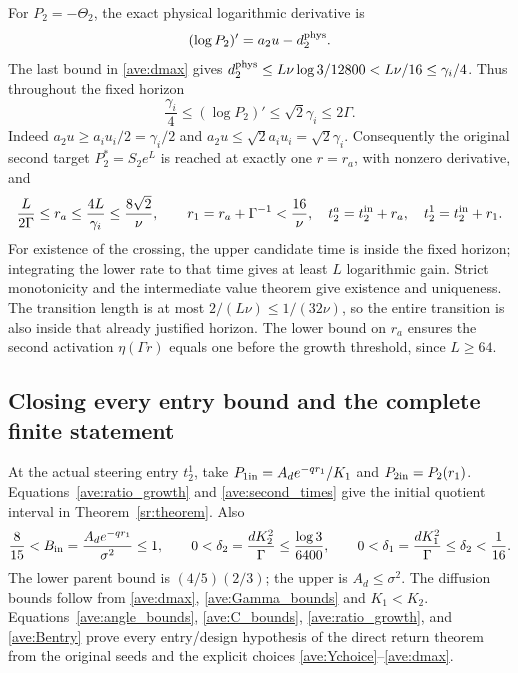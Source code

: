 For $P_2=-\Theta_2$, the exact physical logarithmic derivative is
\[
 (\log P_2)'=a_2u-d_2^{\rm phys}.
\]
The last bound in \eqref{ave:dmax} gives
$d_2^{\rm phys}\leq L\nu\log3/12800<L\nu/16
\leq\gamma_i/4$. Thus throughout the fixed horizon
\begin{equation}\label{ave:growth_rate}
 \frac{\gamma_i}{4}\leq(\log P_2)'
      \leq\sqrt2\gamma_i\leq2\Gamma.
\end{equation}
Indeed $a_2u\geq a_iu_i/2=\gamma_i/2$ and
$a_2u\leq\sqrt2a_iu_i=\sqrt2\gamma_i$.
Consequently the original second target $P_2^*=S_2e^L$ is reached
at exactly one $r=r_a$, with nonzero derivative, and
\begin{equation}\label{ave:second_times}
 \frac{L}{2\Gamma}\leq r_a\leq\frac{4L}{\gamma_i}
       \leq\frac{8\sqrt2}{\nu},\qquad
 r_1=r_a+\Gamma^{-1}<\frac{16}{\nu},
 \quad t_2^a=t_2^{\rm in}+r_a,
 \quad t_2^1=t_2^{\rm in}+r_1.
\end{equation}
For existence of the crossing, the upper candidate time is inside
the fixed horizon; integrating the lower rate to that time gives
at least $L$ logarithmic gain. Strict monotonicity and the intermediate
value theorem give existence and uniqueness. The transition length
is at most $2/(L\nu)\leq1/(32\nu)$, so the entire transition is
also inside that already justified horizon. The lower bound on $r_a$
ensures the second activation $\eta(\Gamma r)$ equals one before
the growth threshold, since $L\geq64$.

\subsection{Closing every entry bound and the complete finite statement}

At the actual steering entry $t_2^1$, take
$P_{1\rm in}=A_de^{-qr_1}/K_1$ and
$P_{2\rm in}=P_2(r_1)$. Equations~\eqref{ave:ratio_growth} and
\eqref{ave:second_times} give the initial quotient interval in
Theorem~\ref{sr:theorem}. Also
\begin{equation}\label{ave:Bentry}
 \frac{8}{15}<B_{\rm in}
 =\frac{A_de^{-qr_1}}{\sigma^2}\leq1,
 \qquad
 0<\delta_2=\frac{dK_2^2}{\Gamma}\leq\frac{\log3}{6400},
 \qquad 0<\delta_1=\frac{dK_1^2}{\Gamma}
       \leq\delta_2<\frac1{16}.
\end{equation}
The lower parent bound is $(4/5)(2/3)$; the upper is
$A_d\leq\sigma^2$. The diffusion bounds follow from
\eqref{ave:dmax}, \eqref{ave:Gamma_bounds} and $K_1<K_2$.
Equations~\eqref{ave:angle_bounds}, \eqref{ave:C_bounds},
\eqref{ave:ratio_growth}, and \eqref{ave:Bentry} prove every
entry/design hypothesis of the direct return theorem from the original
seeds and the explicit choices \eqref{ave:Ychoice}--\eqref{ave:dmax}.

